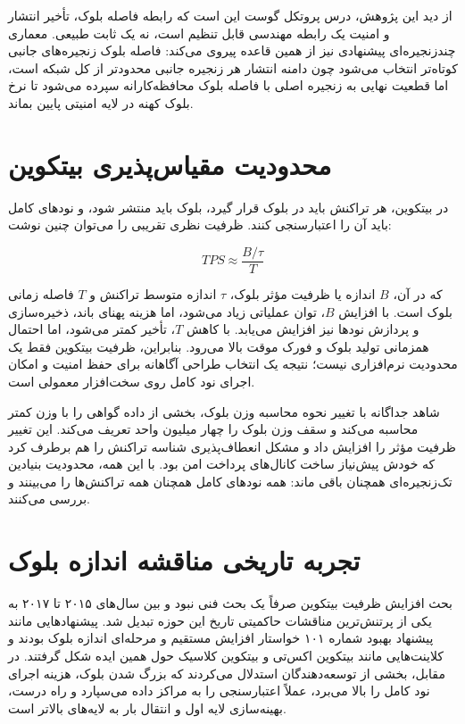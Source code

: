 از دید این پژوهش، درس پروتکل گوست این است که رابطه فاصله بلوک، تأخیر انتشار و امنیت یک رابطه مهندسی قابل تنظیم است، نه یک ثابت طبیعی. معماری چندزنجیره‌ای پیشنهادی نیز از همین قاعده پیروی می‌کند: فاصله بلوک زنجیره‌های جانبی کوتاه‌تر انتخاب می‌شود چون دامنه انتشار هر زنجیره جانبی محدودتر از کل شبکه است، اما قطعیت نهایی به زنجیره اصلی با فاصله بلوک محافظه‌کارانه سپرده می‌شود تا نرخ بلوک کهنه در لایه امنیتی پایین بماند.

\section{محدودیت مقیاس‌پذیری بیتکوین}

در بیتکوین، هر تراکنش باید در بلوک قرار گیرد، بلوک باید منتشر شود، و نودهای کامل باید آن را اعتبارسنجی کنند. ظرفیت نظری تقریبی را می‌توان چنین نوشت:

\begin{latin}
\[
TPS \approx \frac{B / \tau}{T}
\]
\end{latin}

که در آن، \(B\) اندازه یا ظرفیت مؤثر بلوک، \(\tau\) اندازه متوسط تراکنش و \(T\) فاصله زمانی بلوک است. با افزایش \(B\)، توان عملیاتی زیاد می‌شود، اما هزینه پهنای باند، ذخیره‌سازی و پردازش نودها نیز افزایش می‌یابد. با کاهش \(T\)، تأخیر کمتر می‌شود، اما احتمال همزمانی تولید بلوک و فورک موقت بالا می‌رود. بنابراین، ظرفیت بیتکوین فقط یک محدودیت نرم‌افزاری نیست؛ نتیجه یک انتخاب طراحی آگاهانه برای حفظ امنیت و امکان اجرای نود کامل روی سخت‌افزار معمولی است.

شاهد جداگانه با تغییر نحوه محاسبه وزن بلوک، بخشی از داده گواهی را با وزن کمتر محاسبه می‌کند و سقف وزن بلوک را چهار میلیون واحد تعریف می‌کند. این تغییر ظرفیت مؤثر را افزایش داد و مشکل انعطاف‌پذیری شناسه تراکنش را هم برطرف کرد که خودش پیش‌نیاز ساخت کانال‌های پرداخت امن بود. با این همه، محدودیت بنیادین تک‌زنجیره‌ای همچنان باقی ماند: همه نودهای کامل همچنان همه تراکنش‌ها را می‌بینند و بررسی می‌کنند.

\section{تجربه تاریخی مناقشه اندازه بلوک}

بحث افزایش ظرفیت بیتکوین صرفاً یک بحث فنی نبود و بین سال‌های ۲۰۱۵ تا ۲۰۱۷ به یکی از پرتنش‌ترین مناقشات حاکمیتی تاریخ این حوزه تبدیل شد. پیشنهادهایی مانند پیشنهاد بهبود شماره ۱۰۱ خواستار افزایش مستقیم و مرحله‌ای اندازه بلوک بودند و کلاینت‌هایی مانند بیتکوین اکس‌تی و بیتکوین کلاسیک حول همین ایده شکل گرفتند. در مقابل، بخشی از توسعه‌دهندگان استدلال می‌کردند که بزرگ شدن بلوک، هزینه اجرای نود کامل را بالا می‌برد، عملاً اعتبارسنجی را به مراکز داده می‌سپارد و راه درست، بهینه‌سازی لایه اول و انتقال بار به لایه‌های بالاتر است.

